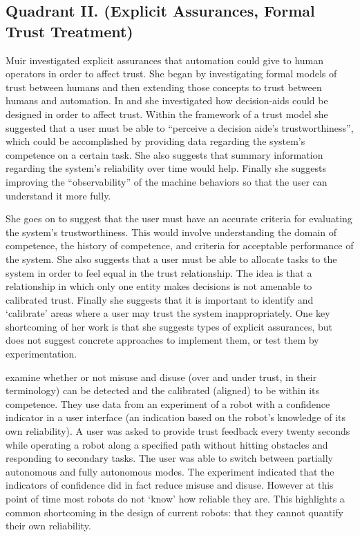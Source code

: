 \subsection{Quadrant II. (Explicit Assurances, Formal Trust Treatment)}\label{sec:q2}
Muir investigated explicit assurances that automation could give to human operators in order to affect trust. She began by investigating formal models of trust between humans and then extending those concepts to trust between humans and automation. In \cite{Muir1987-mk} and \cite{Muir1994-ow} she investigated how decision-aids could be designed in order to affect trust. Within the framework of a trust model she suggested that a user must be able to ``perceive a decision aide's trustworthiness'', which could be accomplished by providing data regarding the system's competence on a certain task. She also suggests that summary information regarding the system's reliability over time would help. Finally she suggests improving the ``observability'' of the machine behaviors so that the user can understand it more fully.

She goes on to suggest that the user must have an accurate criteria for evaluating the system's trustworthiness. This would involve understanding the domain of competence, the history of competence, and criteria for acceptable performance of the system. She also suggests that a user must be able to allocate tasks to the system in order to feel equal in the trust relationship. The idea is that a relationship in which only one entity makes decisions is not amenable to calibrated trust. Finally she suggests that it is important to identify and `calibrate' areas where a user may trust the system inappropriately. One key shortcoming of her work is that she suggests types of explicit assurances, but does not suggest concrete approaches to implement them, or test them by experimentation.

\citet{Kaniarasu2013-ho} examine whether or not misuse and disuse (over and under trust, in their terminology) can be detected and the calibrated (aligned) to be within its competence. They use data from an experiment of a robot with a confidence indicator in a user interface (an indication based on the robot's knowledge of its own reliability). A user was asked to provide trust feedback every twenty seconds while operating a robot along a specified path without hitting obstacles and responding to secondary tasks. The user was able to switch between partially autonomous and fully autonomous modes. The experiment indicated that the indicators of confidence did in fact reduce misuse and disuse. However at this point of time most robots do not `know' how reliable they are. This highlights a common shortcoming in the design of current robots: that they cannot quantify their own reliability.

